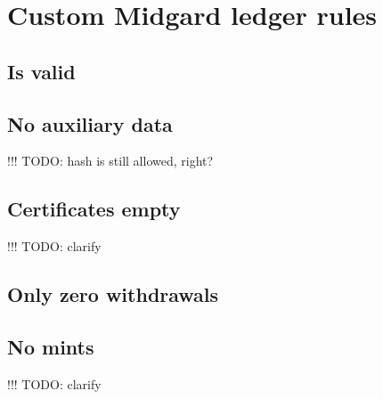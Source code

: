 \documentclass[../midgard.tex]{subfiles}
\begin{document}
\section{Custom Midgard ledger rules}
\label{h:custom-midgard-ledger-rules}

\subsection{Is valid}


\subsection{No auxiliary data}

!!! TODO: hash is still allowed, right?

\subsection{Certificates empty}

!!! TODO: clarify

\subsection{Only zero withdrawals}

\subsection{No mints}

!!! TODO: clarify
\end{document}
